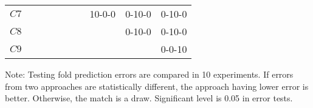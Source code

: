 \begin{table}[ht]
{\begin{threeparttable}
\begin{tabular}{lccccccccc}
$C7$       &      &      &       &       &       &       &10-0-0 &0-10-0 &0-10-0\\
$C8$       &      &      &       &       &       &       &       &0-10-0 &0-10-0\\
$C9$       &      &      &       &       &       &       &       &       &0-0-10\\
\bottomrule\bottomrule
\end{tabular}
Note: Testing fold prediction errors are compared in 10 experiments. If errors from two approaches are statistically different, the approach having lower error is better. Otherwise, the match is a draw. Significant level is 0.05 in error tests.\setlength{\baselineskip}{1.25em}
\end{threeparttable}}
\end{table}
